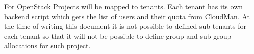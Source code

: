 For OpenStack Projects will be mapped to tenants. Each tenant has its own backend script which gets the list of users and their quota from CloudMan. 
At the time of writing this document it is not possible to defined sub-tenants for each tenant so that it will not be possible to define group and sub-group 
allocations for such project. 

